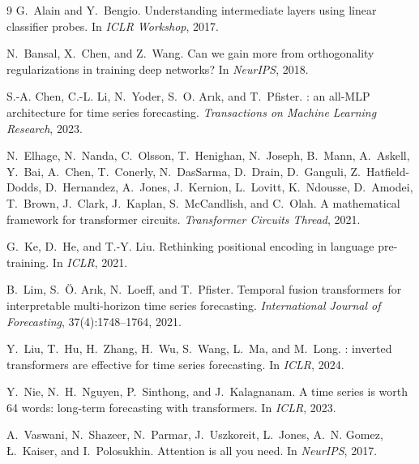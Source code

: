 \documentclass[11pt]{article}
\begin{document}

\begin{thebibliography}{9}
G.~Alain and Y.~Bengio.
\newblock Understanding intermediate layers using linear classifier
  probes.
\newblock In \emph{ICLR Workshop}, 2017.

N.~Bansal, X.~Chen, and Z.~Wang.
\newblock Can we gain more from orthogonality regularizations in training
  deep networks?
\newblock In \emph{NeurIPS}, 2018.

S.-A. Chen, C.-L. Li, N.~Yoder, S.~O. Ar{\i}k, and T.~Pfister.
: an all-{MLP} architecture for time series
  forecasting.
\newblock \emph{Transactions on Machine Learning Research}, 2023.

N.~Elhage, N.~Nanda, C.~Olsson, T.~Henighan, N.~Joseph, B.~Mann,
  A.~Askell, Y.~Bai, A.~Chen, T.~Conerly, N.~DasSarma,
  D.~Drain, D.~Ganguli, Z.~Hatfield-Dodds, D.~Hernandez,
  A.~Jones, J.~Kernion, L.~Lovitt, K.~Ndousse, D.~Amodei,
  T.~Brown, J.~Clark, J.~Kaplan, S.~McCandlish, and C.~Olah.
\newblock A mathematical framework for transformer circuits.
\newblock \emph{Transformer Circuits Thread}, 2021.

G.~Ke, D.~He, and T.-Y. Liu.
\newblock Rethinking positional encoding in language pre-training.
\newblock In \emph{ICLR}, 2021.

B.~Lim, S.~\"O. Ar{\i}k, N.~Loeff, and T.~Pfister.
\newblock Temporal fusion transformers for interpretable multi-horizon
  time series forecasting.
\newblock \emph{International Journal of Forecasting},
  37(4):1748--1764, 2021.

Y.~Liu, T.~Hu, H.~Zhang, H.~Wu, S.~Wang, L.~Ma, and M.~Long.
: inverted transformers are effective for time
  series forecasting.
\newblock In \emph{ICLR}, 2024.

Y.~Nie, N.~H.~Nguyen, P.~Sinthong, and J.~Kalagnanam.
\newblock A time series is worth 64 words: long-term forecasting with
  transformers.
\newblock In \emph{ICLR}, 2023.

A.~Vaswani, N.~Shazeer, N.~Parmar, J.~Uszkoreit, L.~Jones, A.~N. Gomez,
{\L}.~Kaiser, and I.~Polosukhin.
\newblock Attention is all you need.
\newblock In \emph{NeurIPS}, 2017.


\end{thebibliography}
\end{document}
